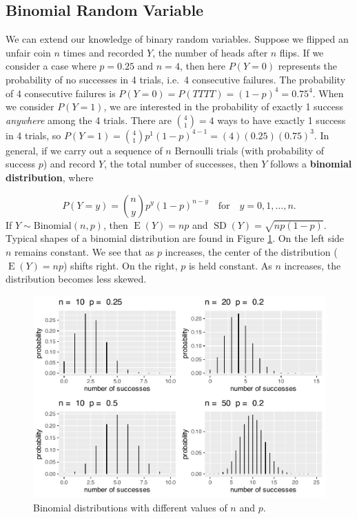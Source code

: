 \documentclass[
]{krantz}
\newcommand{\E}{\operatorname{E}}
\newcommand{\SD}{\operatorname{SD}}
\begin{document}
\hypertarget{sec-binomial}{%
\subsection{Binomial Random Variable}\label{sec-binomial}}

We can extend our knowledge of binary random variables. Suppose we flipped an unfair coin \(n\) times and recorded \(Y\), the number of heads after \(n\) flips. If we consider a case where \(p = 0.25\) and \(n = 4\), then here \(P(Y=0)\) represents the probability of no successes in 4 trials, i.e.~4 consecutive failures. The probability of 4 consecutive failures is \(P(Y = 0) = P(TTTT) = (1-p)^4 = 0.75^4\). When we consider \(P(Y = 1)\), we are interested in the probability of exactly 1 success \emph{anywhere} among the 4 trials. There are \(\binom{4}{1} = 4\) ways to have exactly 1 success in 4 trials, so \(P(Y = 1) = \binom{4}{1}p^1(1-p)^{4-1} = (4)(0.25)(0.75)^3\). In general, if we carry out a sequence of \(n\) Bernoulli trials (with probability of success \(p\)) and record \(Y\), the total number of successes, then \(Y\) follows a \textbf{binomial distribution},  where

\begin{equation}
P(Y=y) = \binom{n}{y} p^y (1-p)^{n-y} \quad \textrm{for} \quad y = 0, 1, \ldots, n.
\label{eq:binomRV}
\end{equation}
If \(Y \sim \textrm{Binomial}(n,p)\), then \(\E(Y) = np\) and \(\SD(Y) = \sqrt{np(1-p)}\).
Typical shapes of a binomial distribution are found in Figure \ref{fig:multBin}. On the left side \(n\) remains constant. We see that as \(p\) increases, the center of the distribution (\(\E(Y) = np\)) shifts right. On the right, \(p\) is held constant. As \(n\) increases, the distribution becomes less skewed.



\begin{figure}

{\centering \includegraphics[width=0.6\linewidth]{bookdown-BeyondMLR_files/figure-latex/multBin-1} 

}

\caption{Binomial distributions with different values of \(n\) and \(p\).}\label{fig:multBin}
\end{figure}
\end{document}
